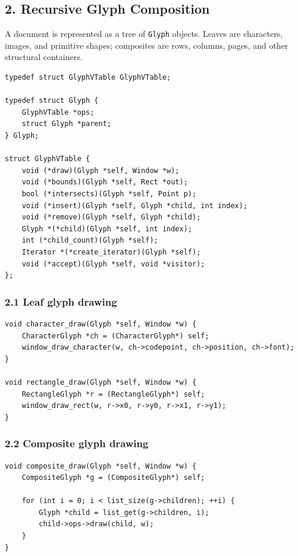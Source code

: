 \documentclass[11pt]{article}
\begin{document}
\subsection{2. Recursive Glyph Composition}\label{recursive-glyph-composition}

A document is represented as a tree of \texttt{Glyph} objects. Leaves are characters, images, and primitive shapes; composites are rows, columns, pages, and other structural containers.

\begin{verbatim}
typedef struct GlyphVTable GlyphVTable;

typedef struct Glyph {
    GlyphVTable *ops;
    struct Glyph *parent;
} Glyph;

struct GlyphVTable {
    void (*draw)(Glyph *self, Window *w);
    void (*bounds)(Glyph *self, Rect *out);
    bool (*intersects)(Glyph *self, Point p);
    void (*insert)(Glyph *self, Glyph *child, int index);
    void (*remove)(Glyph *self, Glyph *child);
    Glyph *(*child)(Glyph *self, int index);
    int (*child_count)(Glyph *self);
    Iterator *(*create_iterator)(Glyph *self);
    void (*accept)(Glyph *self, void *visitor);
};
\end{verbatim}

\subsubsection{2.1 Leaf glyph drawing}\label{leaf-glyph-drawing}

\begin{verbatim}
void character_draw(Glyph *self, Window *w) {
    CharacterGlyph *ch = (CharacterGlyph*) self;
    window_draw_character(w, ch->codepoint, ch->position, ch->font);
}

void rectangle_draw(Glyph *self, Window *w) {
    RectangleGlyph *r = (RectangleGlyph*) self;
    window_draw_rect(w, r->x0, r->y0, r->x1, r->y1);
}
\end{verbatim}

\subsubsection{2.2 Composite glyph drawing}\label{composite-glyph-drawing}

\begin{verbatim}
void composite_draw(Glyph *self, Window *w) {
    CompositeGlyph *g = (CompositeGlyph*) self;

    for (int i = 0; i < list_size(g->children); ++i) {
        Glyph *child = list_get(g->children, i);
        child->ops->draw(child, w);
    }
}
\end{verbatim}
\end{document}

